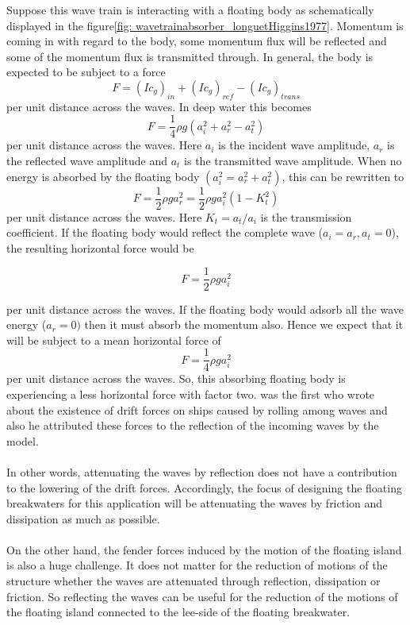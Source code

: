 Suppose this wave train is interacting with a floating body as schematically displayed in the figure\ref{fig: wavetrainabsorber_longuetHiggins1977}. Momentum is coming in with regard to the body, some momentum flux will be reflected and some of the momentum flux is transmitted through. In general, the body is expected to be subject to a force \parencite{longuethiggins1977}
\begin{equation}
    F = (Ic_g)_{in} + (Ic_g)_{ref} - (Ic_g)_{trans}
\end{equation}
per unit distance across the waves. In deep water this becomes
\begin{equation}
    F = \frac{1}{4} \rho g (a_i^2 + a_r^2 - a_t^2) 
    \label{eq: expected forizontal force on body}
\end{equation}
per unit distance across the waves. Here $a_i$ is the incident wave amplitude, $a_r$ is the reflected wave amplitude and $a_t$ is the transmitted wave amplitude. When no energy is absorbed by the floating body $(a_i^2=a_r^2 + a_t^2)$, this can be rewritten to
\begin{equation}
    F = \frac{1}{2} \rho g a_r^2 = \frac{1}{2} \rho g a_i^2(1-K_t^2)
\end{equation}
per unit distance across the waves. Here $K_t=a_t/a_i$ is the transmission coefficient. 
If the floating body would reflect the complete wave ($a_i=a_r, a_t=0$), the resulting horizontal force would be 

\begin{equation}
    F = \frac{1}{2} \rho g a_i^2
\end{equation}


per unit distance across the waves. If the floating body would adsorb all the wave energy ($a_r=0)$ then it must absorb the momentum also.  Hence we expect that it will be subject to a mean horizontal force of
\begin{equation}
    F = \frac{1}{4} \rho g a_i^2
\end{equation}
per unit distance across the waves. So, this absorbing floating body is experiencing a less horizontal force with factor two. \parencite{suyehiro1924drift} was the first who wrote about the existence of drift forces on ships caused by rolling among waves and also he attributed these forces to the reflection of the incoming waves by the model. \\
\\
In other words, attenuating the waves by reflection does not have a contribution to the lowering of the drift forces. Accordingly, the focus of designing the floating breakwaters for this application will be attenuating the waves by friction and dissipation as much as possible. \\
\\
On the other hand, the fender forces induced by the motion of the floating island is also a huge challenge. It does not matter for the reduction of motions of the structure whether the waves are attenuated through reflection, dissipation or friction. So reflecting the waves can be useful for the reduction of the motions of the floating island connected to the lee-side of the floating breakwater.
\\